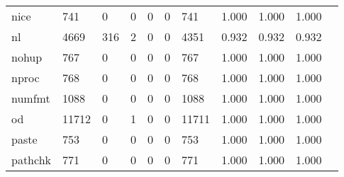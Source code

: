 \begin{longtable}{lp{1.10cm}p{1.10cm}p{1.10cm}p{1.10cm}p{1.10cm}p{1.10cm}p{1.10cm}p{1.10cm}p{1.10cm}p{1.10cm}}
nice      &                    741 &                                  0 &                                 0 &                                0 &                                 0 &                             741 &                          1.000 &                                 1.000 &                               1.000 \\
nl        &                   4669 &                                316 &                                 2 &                                0 &                                 0 &                            4351 &                          0.932 &                                 0.932 &                               0.932 \\
nohup     &                    767 &                                  0 &                                 0 &                                0 &                                 0 &                             767 &                          1.000 &                                 1.000 &                               1.000 \\
nproc     &                    768 &                                  0 &                                 0 &                                0 &                                 0 &                             768 &                          1.000 &                                 1.000 &                               1.000 \\
numfmt    &                   1088 &                                  0 &                                 0 &                                0 &                                 0 &                            1088 &                          1.000 &                                 1.000 &                               1.000 \\
od        &                  11712 &                                  0 &                                 1 &                                0 &                                 0 &                           11711 &                          1.000 &                                 1.000 &                               1.000 \\
paste     &                    753 &                                  0 &                                 0 &                                0 &                                 0 &                             753 &                          1.000 &                                 1.000 &                               1.000 \\
pathchk   &                    771 &                                  0 &                                 0 &                                0 &                                 0 &                             771 &                          1.000 &                                 1.000 &                               1.000 \\

\end{longtable}
